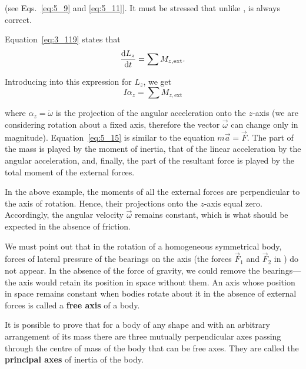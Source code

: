 \noindent
(see Eqs.~\eqref{eq:5_9} and \eqref{eq:5_11}]. It must be stressed that unlike ,  is always correct.

Equation~\eqref{eq:3_119} states that
\begin{equation*}
\frac{\mathrm{d} L_z}{\mathrm{d} t} = \sum M_{z,\text{ext}}.
\end{equation*}

\noindent
Introducing into this expression  for $L_z$, we get
\begin{equation}\label{eq:5_15}
I \alpha_z = \sum M_{z,\text{ext}}
\end{equation}

\noindent
where $\alpha_z=\dot{\omega}$ is the projection of the angular acceleration onto the $z$-axis (we are considering rotation about a fixed axis, therefore the vector $\vec{\omega}$ can change only in magnitude). Equation~\eqref{eq:5_15} is similar to the equation $m\vec{a}=\vec{F}$. The part of the mass is played by the moment of inertia, that of the linear acceleration by the angular acceleration, and, finally, the part of the resultant force is played by the total moment of the external forces.

In the above example, the moments of all the external forces are perpendicular to the axis of rotation. Hence, their projections onto the $z$-axis equal zero. Accordingly, the angular velocity $\vec{\omega}$ remains constant, which is what should be expected in the absence of friction.

We must point out that in the rotation of a homogeneous symmetrical body, forces of lateral pressure of the bearings on the axis (the forces $\vec{F}_1$ and $\vec{F}_2$ in ) do not appear. In the absence of the force of gravity, we could remove the bearings---the axis would retain its position in space without them. An axis whose position in space remains constant when bodies rotate about it in the absence of external forces is called a \textbf{free axis} of a body.

It is possible to prove that for a body of any shape and with an arbitrary arrangement of its mass there are three mutually perpendicular axes passing through the centre of mass of the body that can be free axes. They are called the \textbf{principal axes} of inertia of the body.

